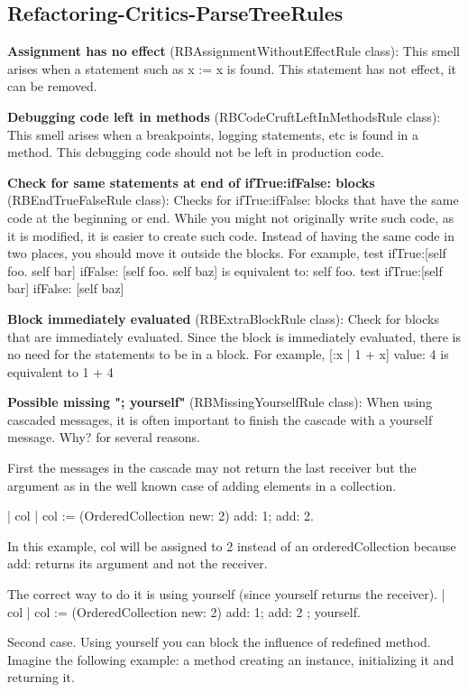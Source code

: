 \subsection{Refactoring-Critics-ParseTreeRules}
\textbf{Assignment has no effect} (RBAssignmentWithoutEffectRule class): This smell arises when a statement such as x := x is found. This statement has not effect, it can be removed.

\textbf{Debugging code left in methods} (RBCodeCruftLeftInMethodsRule class): This smell arises when a breakpoints, logging statements, etc is found in a method. This debugging code should not be left in production code.

\textbf{Check for same statements at end of ifTrue:ifFalse: blocks} (RBEndTrueFalseRule class): Checks for ifTrue:ifFalse: blocks that have the same code at the beginning or end. While you might not originally write such code, as it is modified, it is easier to create such code. Instead of having the same code in two places, you should move it outside the blocks.
For example, 
test 
	ifTrue:[self foo. self bar] 
	ifFalse: [self foo. self baz]
 is equivalent to: 
self foo.  
test 
	ifTrue:[self bar] 
	ifFalse: [self baz]

\textbf{Block immediately evaluated} (RBExtraBlockRule class): Check for blocks that are immediately evaluated. Since the block is immediately evaluated, there is no need for the statements to be in a block.
For example, [:x | 1 + x] value: 4 is equivalent to 1 + 4

\textbf{Possible missing "; yourself"} (RBMissingYourselfRule class): When using cascaded messages, it is often important to finish the cascade with a yourself message. Why? for several reasons. 
	
	First the messages in the cascade may not return the last receiver but the argument as in the well known case of adding elements in a collection.
	
	| col  | 
	col := (OrderedCollection new: 2) add: 1; add: 2.
	
	In this example, col will be assigned to 2 instead of an orderedCollection because add: returns its argument and not the receiver. 
	
	The correct way to do it is using yourself (since yourself returns the receiver).
	| col  | 
	col := (OrderedCollection new: 2) add: 1; add: 2 ; yourself.
	
	
	Second case. Using yourself you can block the influence of redefined method. 
	Imagine the following example: a method creating an instance, initializing it and returning it.
	
